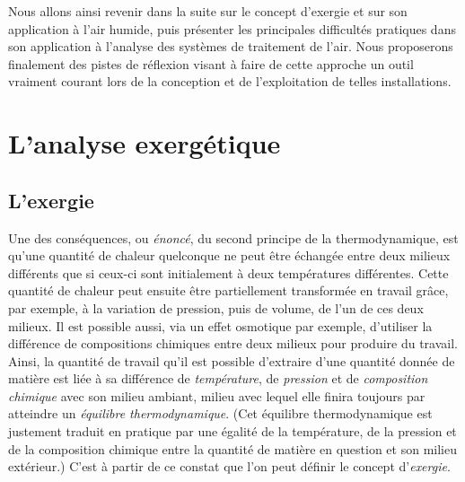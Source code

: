 \documentclass[a4paper,11pt]{scrartcl}
\begin{document}
Nous allons ainsi revenir dans la suite sur le concept d'exergie et sur son application à l'air humide, puis présenter les principales difficultés pratiques dans son application à l'analyse des systèmes de traitement de l'air. Nous proposerons finalement des pistes de réflexion visant à faire de cette approche un outil vraiment courant lors de la conception et de l'exploitation de telles installations.


\section{L'analyse exergétique}

\subsection{L'exergie} Une des conséquences, ou \emph{énoncé}, du second
principe de la thermodynamique, est qu'une quantité de chaleur quelconque ne
peut être échangée entre deux milieux différents que si ceux-ci sont
initialement à deux températures différentes. Cette quantité de chaleur peut
ensuite être partiellement transformée en travail grâce, par exemple, à la
variation de pression, puis de volume, de l'un de ces deux milieux. Il est
possible aussi, via un effet osmotique par exemple, d'utiliser la différence de
compositions chimiques entre deux milieux pour produire du travail. Ainsi, la
quantité de travail qu'il est possible d'extraire d'une quantité donnée de
matière est liée à sa différence de \emph{température}, de \emph{pression} et de
\emph{composition chimique} avec son milieu ambiant, milieu avec lequel elle
finira toujours par atteindre un \emph{équilibre thermodynamique}. (Cet
équilibre thermodynamique est justement traduit en pratique par une égalité de
la température, de la pression et de la composition chimique entre la quantité
de matière en question et son milieu extérieur.) C'est à partir de ce constat
que l'on peut définir le concept d'\emph{exergie}.
\end{document}
